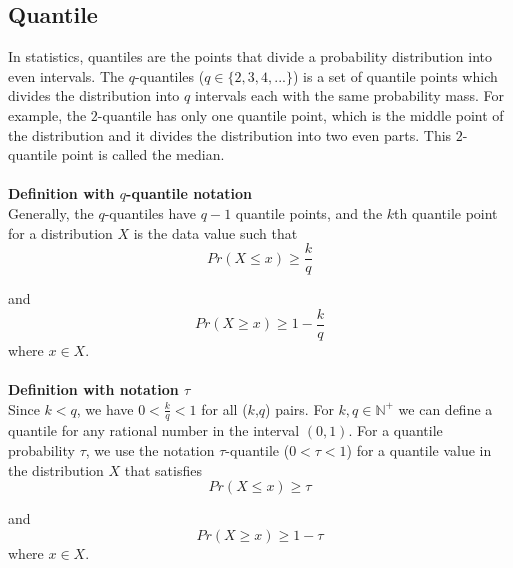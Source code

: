 \subsection{Quantile}
\label{subsec: quant}

In statistics, quantiles are the points that divide a probability distribution into even intervals.
The $q$-quantiles ($q \in \{2,3,4,...\}$) is a set of quantile points which divides the distribution into $q$ intervals each with the same probability mass.
For example, the $2$-quantile has only one quantile point, which is the middle point of the distribution
and it divides the distribution into two even parts. This $2$-quantile point is called the median.
        \\\\
    \textbf{Definition with $q$-quantile notation} \\
    Generally, the $q$-quantiles have $q-1$ quantile points, and the $k$th quantile point for a 
    distribution $X$ is the data value such that%
    \begin{equation}
        Pr(X \leq x) \geq \frac{k}{q}
    \end{equation}
    
    and%
    \begin{equation}
        Pr(X \geq x) \geq 1 - \frac{k}{q}
    \end{equation}
    where $x \in X$.
    \\\\
    \textbf{Definition with notation $\tau$}\\
    Since $k < q$, we have $0 < \frac{k}{q} < 1$ for all ($k$,$q$) pairs. For $k, q \in \mathbb{N}^+$ we can define a quantile for any rational number in the interval $(0,1)$. For a quantile probability $\tau$, we use the notation $\tau$-quantile ($0 < \tau < 1$) for a quantile value in the distribution $X$ that satisfies%
    \begin{equation}
        Pr(X \leq x) \geq \tau
    \end{equation}
    
    and%
    \begin{equation}
        Pr(X \geq x) \geq 1 - \tau
    \end{equation}
    where $x \in X$.

